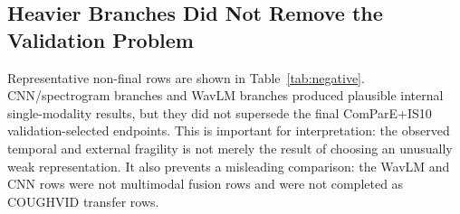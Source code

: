\documentclass[journal]{IEEEtran}
\begin{document}
\begin{table}[t]
\caption{Paper-comparable 10-fold cross-validation. These rows support comparison with common within-dataset reporting practice, but they are not used to claim external reliability.}
\label{tab:cv}
\centering
\footnotesize
{}
\end{table}

\subsection{Heavier Branches Did Not Remove the Validation Problem}
Representative non-final rows are shown in Table~\ref{tab:negative}. CNN/spectrogram branches and WavLM branches produced plausible internal single-modality results, but they did not supersede the final ComParE+IS10 validation-selected endpoints. This is important for interpretation: the observed temporal and external fragility is not merely the result of choosing an unusually weak representation. It also prevents a misleading comparison: the WavLM and CNN rows were not multimodal fusion rows and were not completed as COUGHVID transfer rows.

\begin{table}[t]
\caption{Representative non-final model branches. Architecture or representation complexity alone did not remove the need for stricter validation.}
\label{tab:negative}
\centering
\footnotesize
{}
\end{table}
\end{document}
